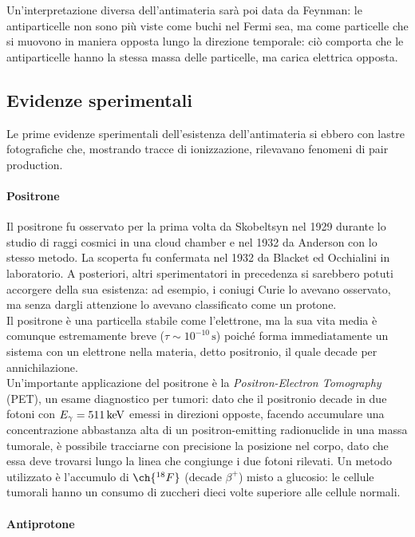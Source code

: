 Un'interpretazione diversa dell'antimateria sarà poi data da Feynman: le antiparticelle non sono più viste come buchi nel Fermi sea, ma come particelle che si muovono in maniera opposta lungo la direzione temporale: ciò comporta che le antiparticelle hanno la stessa massa delle particelle, ma carica elettrica opposta.

\subsection{Evidenze sperimentali}

Le prime evidenze sperimentali dell'esistenza dell'antimateria si ebbero con lastre fotografiche che, mostrando tracce di ionizzazione, rilevavano fenomeni di pair production.

\paragraph{Positrone}

Il positrone fu osservato per la prima volta da Skobeltsyn nel 1929 durante lo studio di raggi cosmici in una cloud chamber e nel 1932 da Anderson con lo stesso metodo. La scoperta fu confermata nel 1932 da Blacket ed Occhialini in laboratorio. A posteriori, altri sperimentatori in precedenza si sarebbero potuti accorgere della sua esistenza: ad esempio, i coniugi Curie lo avevano osservato, ma senza dargli attenzione lo avevano classificato come un protone.\\
Il positrone è una particella stabile come l'elettrone, ma la sua vita media è comunque estremamente breve ($ \tau \sim 10^{-10}\,\text{s} $) poiché forma immediatamente un sistema con un elettrone nella materia, detto positronio, il quale decade per annichilazione.\\
Un'importante applicazione del positrone è la \textit{Positron-Electron Tomography} (PET), un esame diagnostico per tumori: dato che il positronio decade in due fotoni con $ E_{\gamma} = 511\,\mathrm{keV} $ emessi in direzioni opposte, facendo accumulare una concentrazione abbastanza alta di un positron-emitting radionuclide in una massa tumorale, è possibile tracciarne con precisione la posizione nel corpo, dato che essa deve trovarsi lungo la linea che congiunge i due fotoni rilevati. Un metodo utilizzato è l'accumulo di $ \ch{^{18}F} $ (decade $ \beta^+ $) misto a glucosio: le cellule tumorali hanno un consumo di zuccheri dieci volte superiore alle cellule normali.

\paragraph{Antiprotone}

